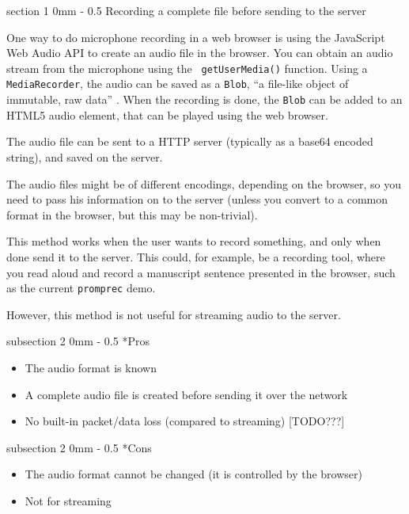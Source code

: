 \documentclass[11pt, a4paper, twoside]{article}
\makeatletter
\renewcommand{\subsection}{\@startsection
  {subsection}%
  {2}%
  {0mm}%
  {-\baselineskip}%
  {0.5\baselineskip}%
  {\bfseries\sffamily\large}}%
\renewcommand{\section}{\@startsection
  {section}%
  {1}%
  {0mm}%
  {-\baselineskip}%
  {0.5\baselineskip}%
  {\bfseries\sffamily\Large}}%
\makeatother
\begin{document}
\section{Recording a complete file before sending to the server}

One way to do microphone recording in a web browser is using the
JavaScript Web Audio API to create an audio file in the browser. You
can obtain an audio stream from the microphone using the {\tt
  getUserMedia()} function. Using a {\tt MediaRecorder}, the audio can
be saved as a {\tt Blob}, ``a file-like object of immutable, raw
data'' \cite{blob}. When the recording is done, the {\tt Blob} can be
added to an HTML5 audio element, that can be played using the web
browser.

The audio file can be sent to a HTTP server (typically as a base64 encoded
string), and saved on the server.

The audio files might be of different encodings, depending on
the browser, so you need to pass his information on to the server
(unless you convert to a common format in the browser, but this may be
non-trivial).

This method works when the user wants to record something, and only
when done send it to the server. This could, for example, be a
recording tool, where you read aloud and record a manuscript sentence
presented in the browser, such as the current {\tt promprec} demo.

However, this method is not useful for streaming audio to the server.

\subsection*{Pros}
\begin{itemize}
\item The audio format is known
\item A complete audio file is created before sending it over the network
\item No built-in packet/data loss (compared to streaming) [TODO???]
\end{itemize}

\subsection*{Cons}
\begin{itemize}
\item The audio format cannot be changed (it is controlled by the browser)
\item Not for streaming
\end{itemize}
\end{document}
